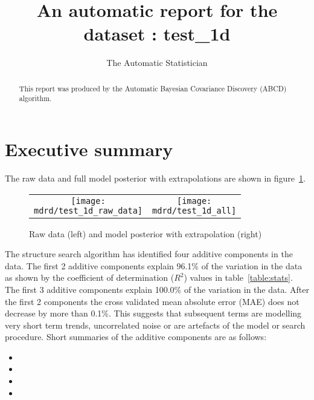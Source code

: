\documentclass{article} %
\title{An automatic report for the dataset : test_1d}
\author{
The Automatic Statistician
}
\begin{document}
\allowdisplaybreaks

\maketitle

\begin{abstract}
This report was produced by the Automatic Bayesian Covariance Discovery (ABCD) algorithm.
\end{abstract}

\section{Executive summary}

The raw data and full model posterior with extrapolations are shown in figure~\ref{fig:rawandfit}.

\begin{figure}[H]
\newcommand{\wmgd}{0.5\columnwidth}
\newcommand{\hmgd}{3.0cm}
\newcommand{\mdrd}{test_1d}
\newcommand{\mbm}{\hspace{-0.3cm}}
\begin{tabular}{cc}
\mbm \texttt{[image: \\mdrd/test\_1d\_raw\_data]} & \texttt{[image: \\mdrd/test\_1d\_all]}
\end{tabular}
\caption{Raw data (left) and model posterior with extrapolation (right)}
\label{fig:rawandfit}
\end{figure}

The structure search algorithm has identified four additive components in the data.
The  first 2 additive components explain 96.1\% of the variation in the data as shown by the coefficient of determination ($R^2$) values in table~\ref{table:stats}.
The  first 3 additive components explain 100.0\% of the variation in the data.
After the first 2 components the cross validated mean absolute error (MAE) does not decrease by more than 0.1\%.
This suggests that subsequent terms are modelling very short term trends, uncorrelated noise or are artefacts of the model or search procedure.
Short summaries of the additive components are as follows:
\begin{itemize}

  \item  

  \item  

  \item  

  \item  

\end{itemize}
\end{document}
